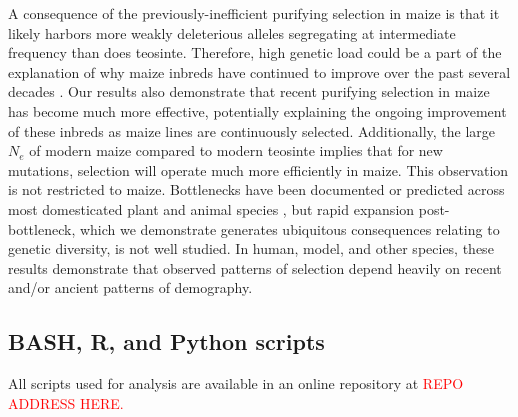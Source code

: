 \documentclass{pnastwo}
\newcommand{\jri}[1]{\textcolor{red}{\scriptsize #1}}
\begin{document}
\begin{article}
A consequence of the previously-inefficient purifying selection in maize is that it likely harbors more weakly deleterious alleles segregating at intermediate frequency than does teosinte. Therefore, high genetic load could be a part of the explanation of why maize inbreds have continued to improve over the past several decades \cite{meghji1984}. Our results also demonstrate that recent purifying selection in maize has become much more effective, potentially explaining the ongoing improvement of these inbreds as maize lines are continuously selected. Additionally, the large $N_e$ of modern maize compared to modern teosinte implies that for new mutations, selection will operate much more efficiently in maize. This observation is not restricted to maize. Bottlenecks have been documented or predicted across most domesticated plant and animal species \cite{doebley2006, hyten2006, zhu2007, bovine2009, larson2013 }, but rapid expansion post-bottleneck, which we demonstrate generates ubiquitous consequences relating to genetic diversity, is not well studied. In human, model, and other species, these results demonstrate that observed patterns of selection depend heavily on recent and/or ancient patterns of demography.





\begin{materials} %

\subsection{BASH, R, and Python scripts}
All scripts used for analysis are available in an online repository at \textcolor{red}{REPO ADDRESS HERE.} 


\end{materials}
\end{article}
\end{document}
